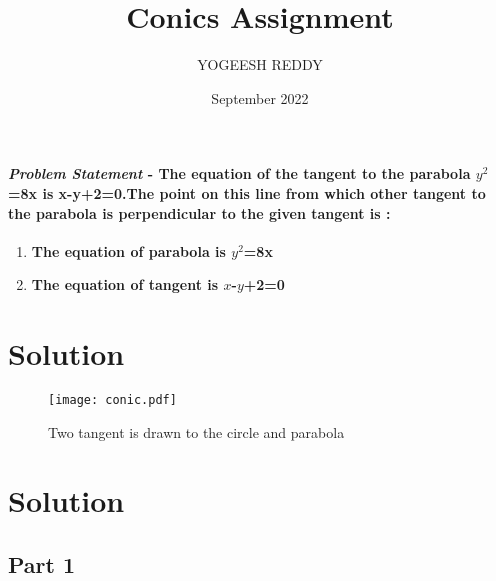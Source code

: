\documentclass[journal,10pt,twocolumn]{article}
\title{\textbf{Conics Assignment}}
\author{YOGEESH REDDY}
\date{September 2022}
\begin{document}
\maketitle
\paragraph{\textit{Problem Statement} - The equation of the  tangent to the parabola $y^2$=8x is x-y+2=0.The point on this line from which other tangent to the parabola is perpendicular to the given tangent is : }
\begin{enumerate}
\item \textbf{The equation of parabola is $y^2$=8x} 
\item \textbf{The equation of tangent is $x$-$y$+2=0}
\end{enumerate}
\section*{Solution}
\begin{figure}[h]
\centering
\texttt{[image: conic.pdf]}
\caption{Two tangent is drawn to the circle and parabola}
\label{fig:Curve}
\end{figure}
\section*{Solution}
\subsection*{Part 1}
\end{document}
